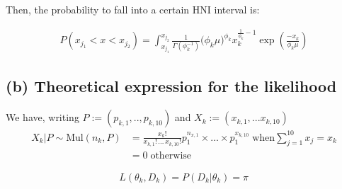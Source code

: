 \documentclass[
]{article}
\begin{document}
Then, the probability to fall into a certain HNI interval is:

\begin{equation}
\begin{split}
P(x_{j_1} < x < x_{j_2}) =\int_{x_{j_1}}^{x_{j_2}} \frac{1}{\Gamma(\phi_k^{-1})} \big( \phi_k \mu \big)^{\phi_k} x_k^{\frac{1}{\phi_k}-1} \exp{(\frac{-x_k}{\phi_k \mu})}
\end{split}
\end{equation}

\hypertarget{b-theoretical-expression-for-the-likelihood}{%
\subsection{(b) Theoretical expression for the
likelihood}\label{b-theoretical-expression-for-the-likelihood}}

We have, writing \(P:=(p_{k,1},..,p_{k,10})\) and
\(X_k:= (x_{k,1},... x_{k,10})\) \[
\begin{split}
X_k |P  \sim \text{Mul}(n_k,P)  & = \frac{x_k!}{x_{k,1}! \, ... \, x_{k,10}! } p_1^{n_{x,1}} \times ... \times p_1^{x_{k,10}} \; \text{when} \sum_{j=1}^{10} x_j = x_k \\
&=0 \; \text{otherwise}
\end{split}
\]

\[
\begin{equation}
\begin{split}
L(\theta_k, D_k) = P (D_k | \theta_k) = \pi_{}
\end{split}
\end{equation}
\]
\end{document}
